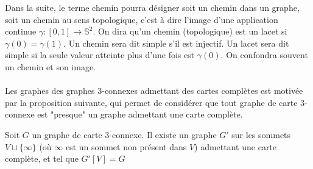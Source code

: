 \documentclass{scrartcl}
\begin{document}
\begin{flushleft}
Dans la suite, le terme chemin pourra désigner soit un chemin dans un graphe, soit un chemin au sens topologique, c'est à dire
l'image d'une application continue $\gamma : [0, 1] \rightarrow \mathbb{S}^2$. On dira qu'un chemin (topologique) est un lacet
si $\gamma(0) = \gamma(1)$. Un chemin sera dit simple s'il est injectif. Un lacet sera dit simple si la seule valeur
atteinte plus d'une fois est $\gamma(0)$. On confondra souvent un chemin et son image.
\\~\\
Les graphes des graphes $3$-connexes admettant des cartes complètes est motivée par la proposition suivante, qui permet
de considérer que tout graphe de carte $3$-connexe est "presque" un graphe admettant une carte complète.

\begin{prop}\label{3connCompl}
    Soit $G$ un graphe de carte $3$-connexe. Il existe un graphe $G'$ sur les sommets $V \sqcup \{\infty\}$ (où $\infty$ est un sommet non
    présent dans $V$) admettant une carte complète, et tel que $G'[V] = G$
\end{prop}


\end{flushleft}
\end{document}
